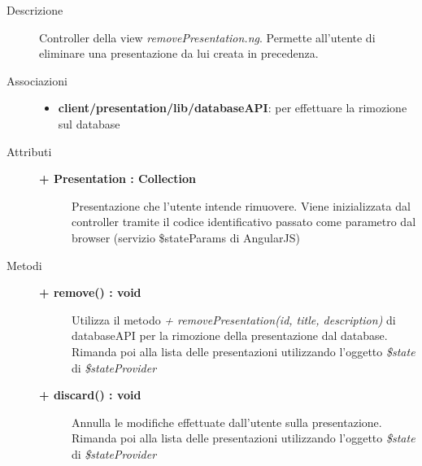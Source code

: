 \begin{description}
\item[Descrizione] \hfill
	Controller della view \textit{removePresentation.ng}. Permette all'utente di eliminare una presentazione da lui creata in precedenza.
	

\item[Associazioni] \hfill
	\begin{itemize}
		\item \textbf{client/presentation/lib/databaseAPI}: per effettuare la rimozione sul database
	\end{itemize}

	
\item[Attributi] \hfill
	\begin{description}
		\item[\textbf{+ Presentation : Collection			}] \hfill
			Presentazione che l'utente intende rimuovere. Viene inizializzata dal controller tramite il codice identificativo passato come parametro dal browser (servizio \$stateParams di AngularJS)
	\end{description}
	
	
\item[Metodi] \hfill

	\begin{description}
		\item[\textbf{\color{blue}+ remove() : void			}] \hfill
			Utilizza il metodo \textit{+ removePresentation(id, title, description)} di databaseAPI per la rimozione della presentazione dal database. Rimanda poi alla lista delle presentazioni utilizzando l'oggetto \textit{\$state} di \textit{\$stateProvider}
	\end{description}
	
	\begin{description}
		\item[\textbf{\color{blue}+ discard() : void			}] \hfill
			Annulla le modifiche effettuate dall'utente sulla presentazione. Rimanda poi alla lista delle presentazioni utilizzando l'oggetto \textit{\$state} di \textit{\$stateProvider}
	\end{description}
	
	
	
\end{description}















